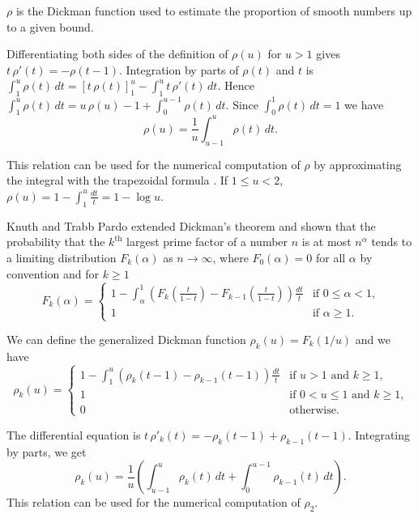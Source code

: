 \documentclass[a4paper, 11pt, pdftex]{report}
\theoremstyle{plain}
\theoremstyle{definition}
\begin{document}
$\rho$ is the Dickman function used to estimate the proportion of smooth numbers up to a given bound.

Differentiating both sides of the definition of $\rho(u)$ for $u > 1$ gives
$t\, \rho'(t) = -\rho(t - 1)$. Integration by parts of $\rho(t)$ and $t$ is
$\int_1^u \rho(t)\, dt = \left[ t\, \rho(t) \right]_1^u - \int_1^u t\, \rho'(t)\, dt$. Hence
$\int_1^u \rho(t)\, dt = u\, \rho(u) - 1 + \int_0^{u-1} \rho(t) \, dt$. Since
$\int_0^1 \rho(t) \, dt = 1$ we have
$$\rho(u) = \frac{1}{u} \int_{u - 1}^u \rho(t)\, dt.$$

This relation can be used for the numerical computation of $\rho$ by approximating the integral
with the trapezoidal formula \cite{LuneWattel1}. If $1 \leq u < 2$,
$\rho(u) = 1 - \int_1^u \frac{dt}{t} = 1 - \log u$.

Knuth and Trabb Pardo \cite{KnuthPardo1} extended Dickman's theorem and shown that the
probability that the $k^\text{th}$ largest prime factor of a number $n$ is at most $n^\alpha$
tends to a limiting distribution $F_k(\alpha)$ as $n \to \infty$, where $F_0(\alpha) = 0$ for all
$\alpha$ by convention and for $k \geq 1$
\begin{equation*}
F_k(\alpha) = \begin{cases}
1 - \int_\alpha^1 \left( F_k \left(\frac{t}{1-t} \right) - F_{k-1} \left(\frac{t}{1-t} \right) \right) \frac{dt}{t} & \text{if } 0 \leq \alpha < 1 \text{,}\\
1& \text{if } \alpha \geq 1 \text{.}
\end{cases}
\end{equation*}

We can define the generalized Dickman function $\rho_k(u) = F_k(1/u)$ and we have
\begin{equation*}
\rho_k(u) = \begin{cases}
1 - \int_1^u \left( \rho_k(t - 1) - \rho_{k-1}(t - 1) \right) \frac{dt}{t}
  & \text{if } u > 1 \text{ and } k\geq 1\text{,}\\
1& \text{if } 0 < u \leq 1 \text{ and } k\geq 1\text{,}\\
0& \text{otherwise.}
\end{cases}
\end{equation*}

The differential equation is $t\, \rho'_k(t) = -\rho_k(t - 1) + \rho_{k-1}(t - 1)$.
Integrating by parts, we get
$$\rho_k(u) = \frac{1}{u} \left( \int_{u-1}^u \rho_k(t)\, dt + \int_0^{u-1} \rho_{k-1}(t)\, dt \right).$$
This relation can be used for the numerical computation of $\rho_2$.
\newpage
\end{document}
